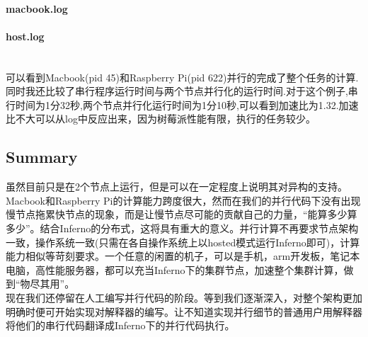 \documentclass[paper=a4]{ctexart} %
\numberwithin{equation}{section} %
\numberwithin{figure}{section} %
\numberwithin{table}{section} %
\newcommand{\n}{\\\indent}
\begin{document}
\paragraph{macbook.log} 

\paragraph{host.log}

~\n 可以看到Macbook(pid 45)和Raspberry Pi(pid 622)并行的完成了整个任务的计算. \n
同时我还比较了串行程序运行时间与两个节点并行化的运行时间.对于这个例子,串行时间为1分32秒,两个节点并行化运行时间为1分10秒,可以看到加速比为1.32.加速比不大可以从log中反应出来，因为树莓派性能有限，执行的任务较少。 \n


\subsection{Summary}
虽然目前只是在2个节点上运行，但是可以在一定程度上说明其对异构的支持。Macbook和Raspberry Pi的计算能力跨度很大，然而在我们的并行代码下没有出现慢节点拖累快节点的现象，而是让慢节点尽可能的贡献自己的力量，“能算多少算多少”。结合Inferno的分布式，这将具有重大的意义。并行计算不再要求节点架构一致，操作系统一致(只需在各自操作系统上以hosted模式运行Inferno即可)，计算能力相似等苛刻要求。一个任意的闲置的机子，可以是手机，arm开发板，笔记本电脑，高性能服务器，都可以充当Inferno下的集群节点，加速整个集群计算，做到“物尽其用”。\n
现在我们还停留在人工编写并行代码的阶段。等到我们逐渐深入，对整个架构更加明确时便可开始实现对解释器的编写。让不知道实现并行细节的普通用户用解释器将他们的串行代码翻译成Inferno下的并行代码执行。
\end{document}
